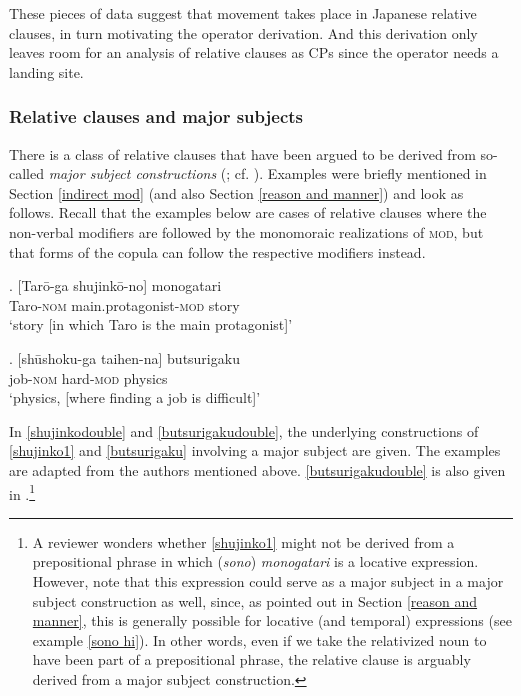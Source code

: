 These pieces of data suggest that movement takes place in Japanese relative clauses, in turn motivating the operator derivation. And this derivation only leaves room for an analysis of relative clauses as CPs since the operator needs a landing site.

\subsubsection{Relative clauses and major subjects} \label{majorsubject}

There is a class of relative clauses that have been argued to be derived from so-called \textit{major subject constructions} (\citealt[§ 9]{kuroda:1992:japanese}; cf. \citealt{kuno:1973:structure, heycock:1993:syntactic, whitman:2013:prehead, miyamoto:2017:RC}). Examples were briefly mentioned in Section \ref{indirect mod} (and also Section \ref{reason and manner}) and look as follows. Recall that the examples below are cases of relative clauses where the non-verbal modifiers are followed by the monomoraic realizations of \textsc{mod}, but that forms of the copula can follow the respective modifiers instead. 

\exg. [Tarō-ga shujinkō-no] monogatari\\
Taro-\textsc{nom} main.protagonist-\textsc{mod} story\\
`story [in which Taro is the main protagonist]’ \null \hfill \citep[66]{watanabe:2010:notes} \label{shujinko1}

\exg. [shūshoku-ga taihen-na] butsurigaku\\
job-\textsc{nom} hard-\textsc{mod} physics\\
`physics, [where finding a job is difficult]’ \null \hfill \citep[255]{kuno:1973:structure} \label{butsurigaku}

In \ref{shujinkodouble} and \ref{butsurigakudouble}, the underlying constructions of \ref{shujinko1} and \ref{butsurigaku} involving a major subject are given. The examples are adapted from the authors mentioned above. \ref{butsurigakudouble} is also given in \citet[179]{heycock:1993:syntactic}.\footnote{A reviewer wonders whether \ref{shujinko1} might not be derived from a prepositional phrase in which (\textit{sono}) \textit{monogatari} is a locative expression. However, note that this expression could serve as a major subject in a major subject construction as well, since, as pointed out in Section \ref{reason and manner}, this is generally possible for locative (and temporal) expressions (see example \ref{sono hi}). In other words, even if we take the relativized noun to have been part of a prepositional phrase, the relative clause is arguably derived from a major subject construction.}  

